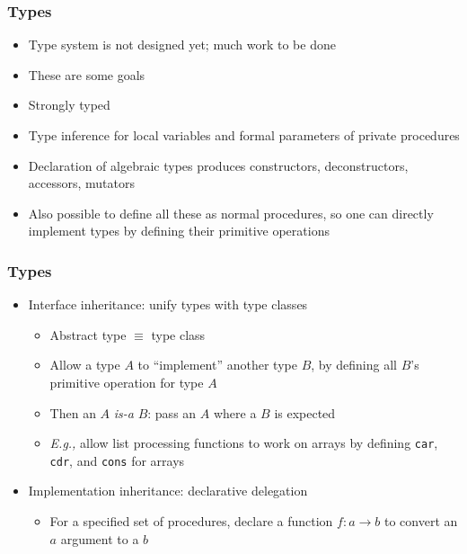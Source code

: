 \documentclass[12pt]{beamer}
\begin{document}
\begin{frame}
\frametitle{Types}
\begin{itemize}
\item Type system is not designed yet; much work to be done
\item These are some goals
\item Strongly typed
\item Type inference for local variables and formal parameters of
  private procedures
\item Declaration of algebraic types produces
  constructors, deconstructors, accessors, mutators
\item Also possible to define all these as normal procedures, so one can
  directly implement types by defining their primitive operations
\end{itemize}
\end{frame}


\begin{frame}
\frametitle{Types}
\begin{itemize}
\item Interface inheritance: unify types with type classes
  \begin{itemize}
  \item Abstract type $\equiv$ type class
  \item Allow a type $A$ to ``implement'' another type $B$, by
    defining all $B$'s primitive operation for type $A$
  \item Then an $A$ \emph{is-a} $B$: pass an $A$ where a $B$ is expected
  \item \emph{E.g.,} allow list processing functions to work on arrays
  by defining \texttt{car}, \texttt{cdr}, and \texttt{cons} for arrays
\end{itemize}
\item Implementation inheritance: declarative delegation
  \begin{itemize}
  \item For a specified set of procedures, 
    declare a function $f: a \to b$ to convert an $a$ argument to a $b$
  \end{itemize}
\end{itemize}
\end{frame}
\end{document}
